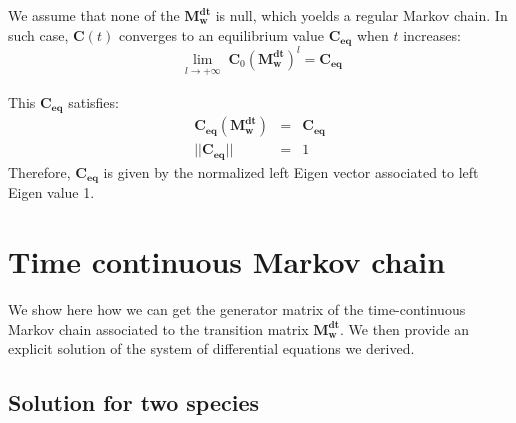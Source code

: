 We assume that none of the $\mathbf{M^{dt}_w}$ is null, which yoelds a regular Markov chain. In such case, $\mathbf{C}(t)$ converges to an equilibrium value $\mathbf{C_{eq}}$ when $t$ increases:
\begin{equation}
\lim\limits_{\substack{l \to +\infty }} \mathbf{C}_0(\mathbf{M^{dt}_w})^l=\mathbf{C_{eq}}
\end{equation}

This $\mathbf{C_{eq}}$ satisfies:
\begin{eqnarray}
\mathbf{C_{eq}}(\mathbf{M^{dt}_w}) &=& \mathbf{C_{eq}} \\
||\mathbf{C_{eq}}|| &=& 1
\end{eqnarray}
Therefore, $\mathbf{C_{eq}}$ is given by the normalized left Eigen vector associated to left Eigen value 1.



\section{Time continuous Markov chain}

We show here how we can get the generator matrix of the time-continuous Markov chain associated to the transition matrix $\mathbf{M^{dt}_w}$. We then provide an explicit solution of the system of differential equations we derived.

\subsection{Solution for two species}

